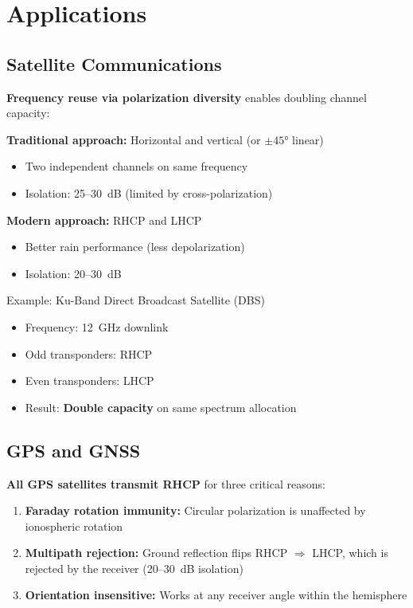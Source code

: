 \section{Applications}

\subsection{Satellite Communications}

\textbf{Frequency reuse via polarization diversity} enables doubling channel capacity:

\textbf{Traditional approach:} Horizontal and vertical (or $\pm 45°$ linear)
\begin{itemize}
\item Two independent channels on same frequency
\item Isolation: 25--30~dB (limited by cross-polarization)
\end{itemize}

\textbf{Modern approach:} RHCP and LHCP
\begin{itemize}
\item Better rain performance (less depolarization)
\item Isolation: 20--30~dB
\end{itemize}

\begin{calloutbox}{Example: Ku-Band Direct Broadcast Satellite (DBS)}
\begin{itemize}
\item Frequency: 12~GHz downlink
\item Odd transponders: RHCP
\item Even transponders: LHCP
\item Result: \textbf{Double capacity} on same spectrum allocation
\end{itemize}
\end{calloutbox}

\subsection{GPS and GNSS}

\textbf{All GPS satellites transmit RHCP} for three critical reasons:

\begin{enumerate}
\item \textbf{Faraday rotation immunity:} Circular polarization is unaffected by ionospheric rotation
\item \textbf{Multipath rejection:} Ground reflection flips RHCP $\Rightarrow$ LHCP, which is rejected by the receiver (20--30~dB isolation)
\item \textbf{Orientation insensitive:} Works at any receiver angle within the hemisphere
\end{enumerate}

